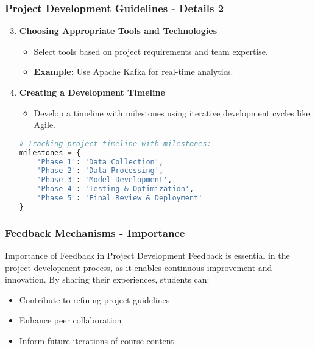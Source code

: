 \documentclass[aspectratio=169]{beamer}
\begin{document}
\begin{frame}[fragile]
    \frametitle{Project Development Guidelines - Details 2}
    \begin{enumerate}
        \setcounter{enumi}{2} %
        \item \textbf{Choosing Appropriate Tools and Technologies}
            \begin{itemize}
                \item Select tools based on project requirements and team expertise.
                \item \textbf{Example:} Use Apache Kafka for real-time analytics.
            \end{itemize}

        \item \textbf{Creating a Development Timeline}
            \begin{itemize}
                \item Develop a timeline with milestones using iterative development cycles like Agile.
            \end{itemize}
            \begin{lstlisting}[language=Python]
# Tracking project timeline with milestones:
milestones = {
    'Phase 1': 'Data Collection',
    'Phase 2': 'Data Processing',
    'Phase 3': 'Model Development',
    'Phase 4': 'Testing & Optimization',
    'Phase 5': 'Final Review & Deployment'
}
            \end{lstlisting}
    \end{enumerate}
\end{frame}

\begin{frame}[fragile]
    \frametitle{Feedback Mechanisms - Importance}
    \begin{block}{Importance of Feedback in Project Development}
        Feedback is essential in the project development process, as it enables continuous improvement and innovation. By sharing their experiences, students can:
        \begin{itemize}
            \item Contribute to refining project guidelines
            \item Enhance peer collaboration
            \item Inform future iterations of course content
        \end{itemize}
    \end{block}
\end{frame}
\end{document}

